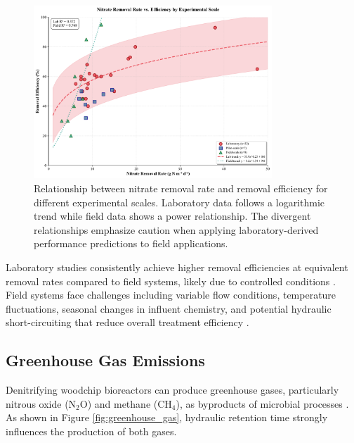 \documentclass[12pt,a4paper]{article}
\begin{document}
\begin{figure}[ht]
\centering
\includegraphics[width=0.8\textwidth]{fig2_rate_efficiency_scientific}
\caption{Relationship between nitrate removal rate and removal efficiency for different experimental scales. Laboratory data follows a logarithmic trend while field data shows a power relationship. The divergent relationships emphasize caution when applying laboratory-derived performance predictions to field applications.}
\label{fig:rate_vs_efficiency}
\end{figure}

Laboratory studies consistently achieve higher removal efficiencies at equivalent removal rates compared to field systems, likely due to controlled conditions \citep{RN611}. Field systems face challenges including variable flow conditions, temperature fluctuations, seasonal changes in influent chemistry, and potential hydraulic short-circuiting that reduce overall treatment efficiency \citep{RN312, RN309}.

\subsection{Greenhouse Gas Emissions}

Denitrifying woodchip bioreactors can produce greenhouse gases, particularly nitrous oxide (N$_{2}$O) and methane (CH$_{4}$), as byproducts of microbial processes \citep{RN1181, RN611}. As shown in Figure \ref{fig:greenhouse_gas}, hydraulic retention time strongly influences the production of both gases.
\end{document}

